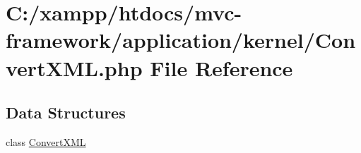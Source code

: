 \hypertarget{_convert_x_m_l_8php}{}\section{C\+:/xampp/htdocs/mvc-\/framework/application/kernel/\+Convert\+X\+ML.php File Reference}
\label{_convert_x_m_l_8php}
\subsection*{Data Structures}
\begin{DoxyCompactItemize}
\item 
class \hyperlink{class_convert_x_m_l}{Convert\+X\+ML}
\end{DoxyCompactItemize}
